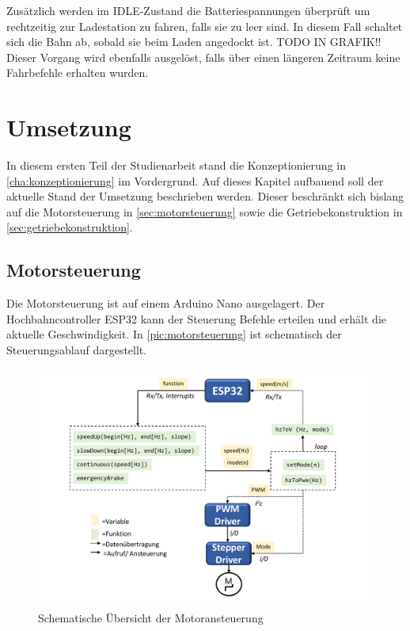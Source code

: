 Zusätzlich werden im IDLE-Zustand die Batteriespannungen überprüft um rechtzeitig zur Ladestation zu fahren, falls sie zu leer sind. In diesem Fall schaltet sich die Bahn ab, sobald sie beim Laden angedockt ist. TODO IN GRAFIK!! Dieser Vorgang wird ebenfalls ausgelöst, falls über einen längeren Zeitraum keine Fahrbefehle erhalten wurden.


\chapter{Umsetzung}
\label{cha:umsetzung}
In diesem ersten Teil der Studienarbeit stand die Konzeptionierung in \autoref{cha:konzeptionierung} im Vordergrund. Auf dieses Kapitel aufbauend soll der aktuelle Stand der Umsetzung beschrieben werden. Dieser beschränkt sich bislang auf die Motorsteuerung in \autoref{sec:motorsteuerung} sowie die Getriebekonstruktion in \autoref{sec:getriebekonstruktion}.
\newpage
 
\section{Motorsteuerung}
\label{sec:motorsteuerung}
Die Motorsteuerung ist auf einem Arduino Nano ausgelagert. Der Hochbahncontroller ESP32 kann der Steuerung Befehle erteilen und erhält die aktuelle Geschwindigkeit. In \autoref{pic:motorsteuerung} ist schematisch der Steuerungsablauf  dargestellt. 

\begin{figure}[h]
	\begin{center}
		\includegraphics[width=16cm]{motorsteuerung.pdf}
		\caption{Schematische Übersicht der Motoransteuerung}
		\label{pic:motorsteuerung}
	\end{center}
\end{figure}



